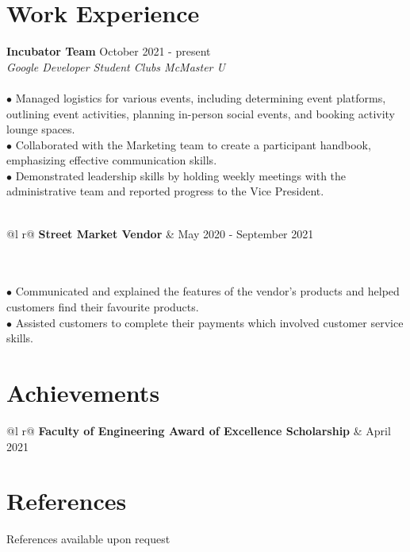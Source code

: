 \documentclass[letterpaper,12pt]{article}
\begin{document}
\section{Work Experience}
\textbf{Incubator Team}  \hfill   October 2021 - present \\
\textit{Google Developer Student Clubs McMaster U}
\\\\\hspace{0.1cm} $\bullet$ Managed logistics for various events, including determining event platforms, outlining event activities, planning in-person social events, and booking activity lounge spaces. \\ 
\hspace{0.1cm} $\bullet$ \hspace{0.05cm}Collaborated with the Marketing team to create a participant handbook, emphasizing effective communication skills.\\
\hspace{0.1cm} $\bullet$ \hspace{0.03cm}Demonstrated leadership skills by holding weekly meetings with the administrative team and reported progress to the Vice President.\\\\
\begin{tabularx}{\linewidth}{ @{}l r@{} }
\textbf{Street Market Vendor} &  \hfill \normalsize{May 2020 - September 2021} \\
\end{tabularx} \\\\
\hspace{0.1cm} $\bullet$ Communicated and explained the features of the vendor's products and helped customers find their favourite products.\\
\hspace{0.1cm} $\bullet$ Assisted customers to complete their payments which involved customer service skills.

\section{Achievements}
\begin{tabularx}{\linewidth}{ @{}l r@{} }
\textbf{Faculty of Engineering Award of Excellence Scholarship} & \hfill April 2021 \\
\end{tabularx}

\section{References}
References available upon request
\end{document}
